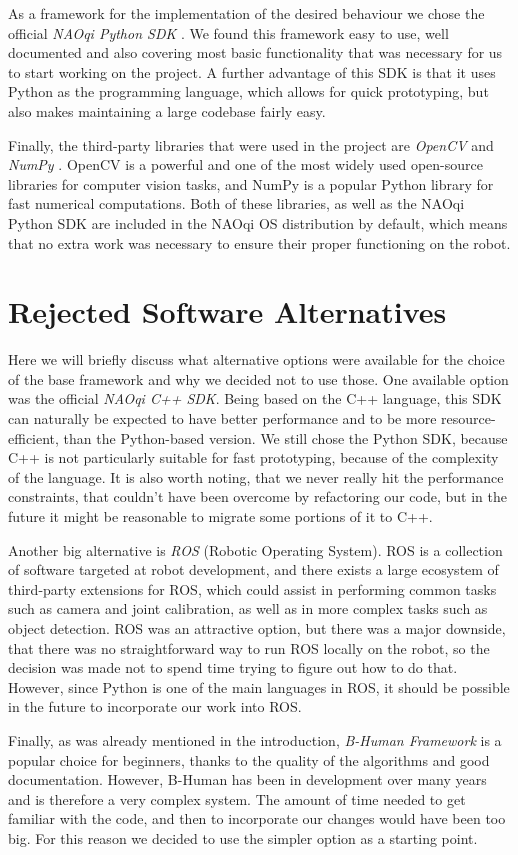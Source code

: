 As a framework for the implementation of the desired behaviour we chose the
official \textit{NAOqi Python SDK} \cite{naoqi-sdk}. We found this framework
easy to use, well documented and also covering most basic functionality that
was necessary for us to start working on the project. A further advantage of
this SDK is that it uses Python as the programming language, which allows for
quick prototyping, but also makes maintaining a large codebase fairly easy.

Finally, the third-party libraries that were used in the project are
\textit{OpenCV} and \textit{NumPy} \cite{opencv, numpy}. OpenCV is a powerful
and one of the most widely used open-source libraries for computer vision
tasks, and NumPy is a popular Python library for fast numerical computations.
Both of these libraries, as well as the NAOqi Python SDK are included in the
NAOqi OS distribution by default, which means that no extra work was necessary
to ensure their proper functioning on the robot.

\section{Rejected Software Alternatives}

Here we will briefly discuss what alternative options were available for the
choice of the base framework and why we decided not to use those. One
available option was the official \textit{NAOqi C++ SDK}. Being based on the
C++ language, this SDK can naturally be expected to have better performance and to be more resource-efficient, than the Python-based version. We still chose the
Python SDK, because C++ is not particularly suitable for fast prototyping,
because of the complexity of the language. It is also worth noting, that we
never really hit the performance constraints, that couldn't have been overcome
by refactoring our code, but in the future it might be reasonable to migrate
some portions of it to C++.

Another big alternative is \textit{ROS} \cite{ros} (Robotic Operating System).
ROS is a collection of software targeted at robot development, and there exists
a large ecosystem of third-party extensions for ROS, which could assist in
performing common tasks such as camera and joint calibration, as well as in
more complex tasks such as object detection. ROS was an attractive option, but
there was a major downside, that there was no straightforward way to run ROS
locally on the robot, so the decision was made not to spend time trying to
figure out how to do that. However, since Python is one of the main languages
in ROS, it should be possible in the future to incorporate our work into ROS.

Finally, as was already mentioned in the introduction, \textit{B-Human
  Framework} is a popular choice for beginners, thanks to the quality of the
algorithms and good documentation. However, B-Human has been in development
over many years and is therefore a very complex system. The amount of time needed
to get familiar with the code, and then to incorporate our changes would have
been too big. For this reason we decided to use the simpler option as a
starting point.
